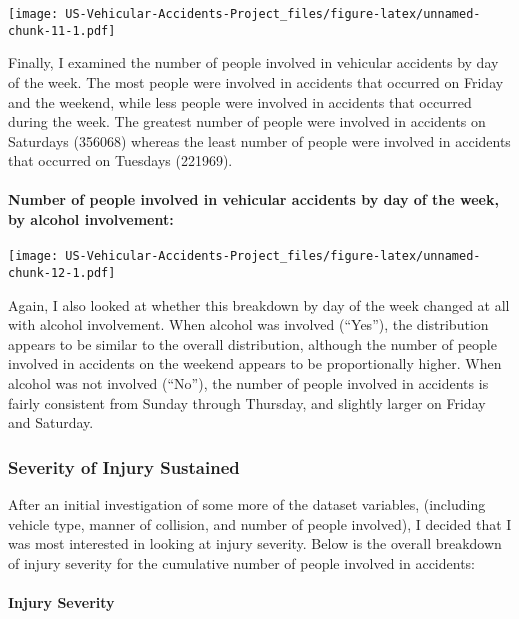 \documentclass[]{article}
\let\oldparagraph\paragraph
\renewcommand{\paragraph}[1]{\oldparagraph{#1}\mbox{}}
\begin{document}
\texttt{[image: US-Vehicular-Accidents-Project\_files/figure-latex/unnamed-chunk-11-1.pdf]}

Finally, I examined the number of people involved in vehicular accidents
by day of the week. The most people were involved in accidents that
occurred on Friday and the weekend, while less people were involved in
accidents that occurred during the week. The greatest number of people
were involved in accidents on Saturdays (356068) whereas the least
number of people were involved in accidents that occurred on Tuesdays
(221969).

\hypertarget{number-of-people-involved-in-vehicular-accidents-by-day-of-the-week-by-alcohol-involvement}{%
\paragraph{Number of people involved in vehicular accidents by day of
the week, by alcohol
involvement:}\label{number-of-people-involved-in-vehicular-accidents-by-day-of-the-week-by-alcohol-involvement}}

\texttt{[image: US-Vehicular-Accidents-Project\_files/figure-latex/unnamed-chunk-12-1.pdf]}

Again, I also looked at whether this breakdown by day of the week
changed at all with alcohol involvement. When alcohol was involved
(``Yes''), the distribution appears to be similar to the overall
distribution, although the number of people involved in accidents on the
weekend appears to be proportionally higher. When alcohol was not
involved (``No''), the number of people involved in accidents is fairly
consistent from Sunday through Thursday, and slightly larger on Friday
and Saturday.

\hypertarget{severity-of-injury-sustained}{%
\subsubsection{Severity of Injury
Sustained}\label{severity-of-injury-sustained}}

After an initial investigation of some more of the dataset variables,
(including vehicle type, manner of collision, and number of people
involved), I decided that I was most interested in looking at injury
severity. Below is the overall breakdown of injury severity for the
cumulative number of people involved in accidents:

\hypertarget{injury-severity}{%
\paragraph{Injury Severity}\label{injury-severity}}
\end{document}
